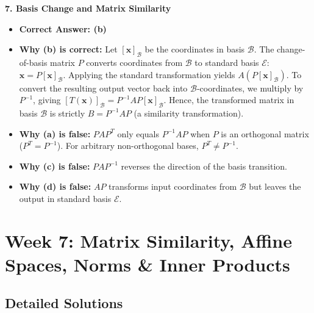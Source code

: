 \textbf{7. Basis Change and Matrix Similarity}
\begin{itemize}
    \item \textbf{Correct Answer: (b)}
    \item \textbf{Why (b) is correct:} Let $[\mathbf{x}]_\mathcal{B}$ be the coordinates in basis $\mathcal{B}$. The change-of-basis matrix $P$ converts coordinates from $\mathcal{B}$ to standard basis $\mathcal{E}$: $\mathbf{x} = P [\mathbf{x}]_\mathcal{B}$. Applying the standard transformation yields $A(P [\mathbf{x}]_\mathcal{B})$. To convert the resulting output vector back into $\mathcal{B}$-coordinates, we multiply by $P^{-1}$, giving $[T(\mathbf{x})]_\mathcal{B} = P^{-1} A P [\mathbf{x}]_\mathcal{B}$. Hence, the transformed matrix in basis $\mathcal{B}$ is strictly $B = P^{-1} A P$ (a similarity transformation).
    \item \textbf{Why (a) is false:} $P A P^T$ only equals $P^{-1} A P$ when $P$ is an orthogonal matrix ($P^T = P^{-1}$). For arbitrary non-orthogonal bases, $P^T \neq P^{-1}$.
    \item \textbf{Why (c) is false:} $P A P^{-1}$ reverses the direction of the basis transition.
    \item \textbf{Why (d) is false:} $A P$ transforms input coordinates from $\mathcal{B}$ but leaves the output in standard basis $\mathcal{E}$.
\end{itemize}

\section*{Week 7: Matrix Similarity, Affine Spaces, Norms \& Inner Products}

\subsection*{Detailed Solutions}

